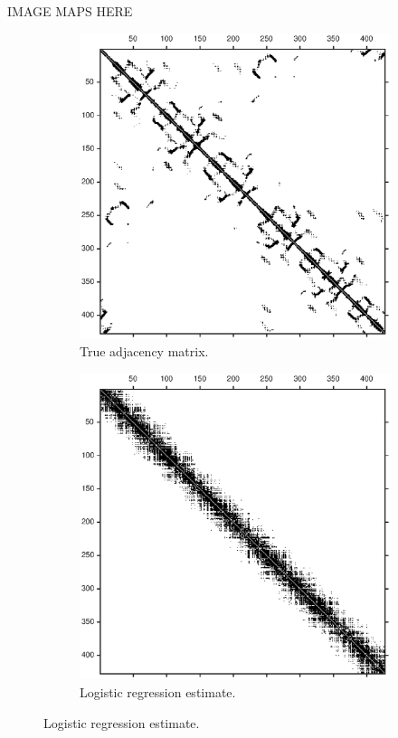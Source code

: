 \documentclass{article}
\begin{document}
IMAGE MAPS HERE
\begin{figure}
\centering
\begin{subfigure}{0.45\textwidth}
\includegraphics[width=\linewidth]{paper_images/true_adj.eps}
\centering
\caption{True adjacency matrix.}
\end{subfigure}
\begin{subfigure}{0.45\textwidth}
\includegraphics[width=\linewidth]{paper_images/logistic_adj.eps}
\centering
\caption{Logistic regression estimate.}
\end{subfigure}


\end{figure}
\end{document}
